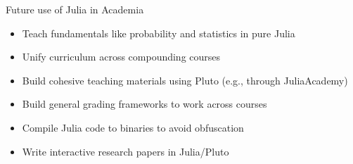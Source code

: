 \begin{frame}[fragile]{Future use of Julia in Academia} \pause

\begin{itemize}
    \item Teach fundamentals like probability and statistics in pure Julia \pause
    \item Unify curriculum across compounding courses \pause
    \item Build cohesive teaching materials using Pluto (e.g., through JuliaAcademy) \pause
    \item Build general grading frameworks to work across courses \pause
    \item Compile Julia code to binaries to avoid obfuscation \pause
    \item Write interactive research papers in Julia/Pluto
\end{itemize}

\end{frame}
